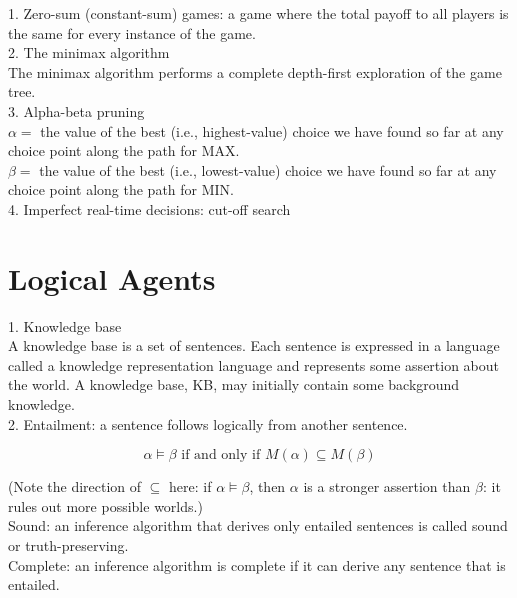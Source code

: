 \documentclass[12pt]{article}
\begin{document}
1. Zero-sum (constant-sum) games: a game where the total payoff to all players is the same for every instance of the game. \\

2. The minimax algorithm \\

The minimax algorithm performs a complete depth-first exploration of the game tree. \\

3. Alpha-beta pruning \\

$\alpha =$ the value of the best (i.e., highest-value) choice we have found so far at any choice point along the path for MAX. \\

$\beta =$ the value of the best (i.e., lowest-value) choice we have found so far at any choice point along the path for MIN. \\

4. Imperfect real-time decisions: cut-off search

\section*{Logical Agents}

1. Knowledge base \\

A knowledge base is a set of sentences. Each sentence is expressed in a language called a knowledge representation language and represents some assertion about the world. A knowledge base, KB, may initially contain some background knowledge. \\

2. Entailment: a sentence follows logically from another sentence.

\begin{equation*}
  \alpha \models \beta \text{ if and only if } M(\alpha) \subseteq M(\beta)
\end{equation*}

(Note the direction of $\subseteq$ here: if $\alpha \models \beta$, then $\alpha$ is a stronger assertion than $\beta$: it rules out more possible worlds.) \\

Sound: an inference algorithm that derives only entailed sentences is called sound or truth-preserving. \\

Complete: an inference algorithm is complete if it can derive any sentence that is entailed. \\
\end{document}
